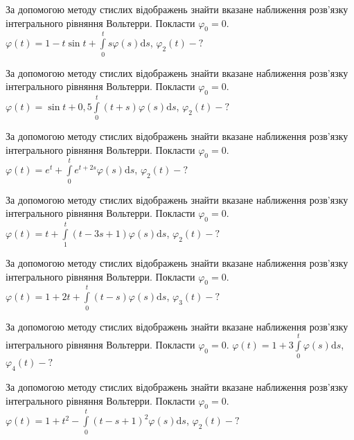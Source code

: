 \documentclass[12pt]{extarticle}
\begin{document}
\begin{Exercise}
За допомогою методу стислих відображень знайти вказане наближення розв’язку інтегрального рівняння Вольтерри. Покласти $\varphi_0=0$. $\varphi(t) = 1 - t\sin t + \int\limits_{0}^{t} s \varphi(s) \mathrm{d}s$, $\varphi_2(t) - ?$
\end{Exercise}

\begin{Exercise}
За допомогою методу стислих відображень знайти вказане наближення розв’язку інтегрального рівняння Вольтерри. Покласти $\varphi_0=0$. $\varphi(t) = \sin t + 0,5\int\limits_{0}^{t} (t+s) \varphi(s) \mathrm{d}s$, $\varphi_2(t) - ?$
\end{Exercise}

\begin{Exercise}
За допомогою методу стислих відображень знайти вказане наближення розв’язку інтегрального рівняння Вольтерри. Покласти $\varphi_0=0$. $\varphi(t) = e^t + \int\limits_{0}^{t} e^{t+2s} \varphi(s) \mathrm{d}s$, $\varphi_2(t) - ?$
\end{Exercise}

\begin{Exercise}
За допомогою методу стислих відображень знайти вказане наближення розв’язку інтегрального рівняння Вольтерри. Покласти $\varphi_0=0$. $\varphi(t) = t + \int\limits_{1}^{t} (t-3s+1)\varphi(s) \mathrm{d}s$, $\varphi_2(t) - ?$
\end{Exercise}

\begin{Exercise}
За допомогою методу стислих відображень знайти вказане наближення розв’язку інтегрального рівняння Вольтерри. Покласти $\varphi_0=0$. $\varphi(t) = 1 + 2t + \int\limits_{0}^{t} (t-s)\varphi(s) \mathrm{d}s$, $\varphi_3(t) - ?$
\end{Exercise}

\begin{Exercise}
За допомогою методу стислих відображень знайти вказане наближення розв’язку інтегрального рівняння Вольтерри. Покласти $\varphi_0=0$. $\varphi(t) = 1 + 3\int\limits_{0}^{t} \varphi(s) \mathrm{d}s$, $\varphi_4(t) - ?$
\end{Exercise}

\begin{Exercise}
За допомогою методу стислих відображень знайти вказане наближення розв’язку інтегрального рівняння Вольтерри. Покласти $\varphi_0=0$. $\varphi(t) = 1 + t^2 - \int\limits_{0}^{t} (t-s+1)^2 \varphi(s) \mathrm{d}s$, $\varphi_2(t) - ?$
\end{Exercise}
\end{document}
